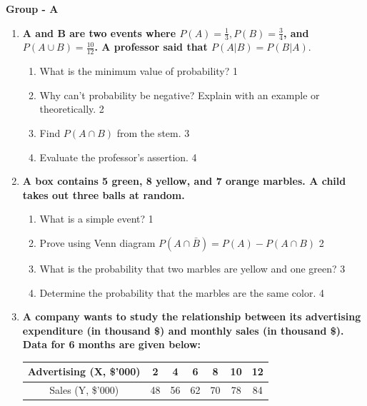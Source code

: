 \documentclass[12pt]{article}
\begin{document}
\begin{center}
\textbf{Group  - A}
\end{center}
\begin{enumerate}

  \item
	  \textbf{A and B are two events where $P(A) = \frac 13, P(B) = \frac 34$, and $P(A\cup B) = \frac{10}{12}$. A professor said that $P(A|B) = P(B|A)$}. 
  
  \begin{enumerate}
    \item
	What is the minimum value of probability? \hfill 1
    \item
	Why can't probability be negative? Explain with an example or theoretically. \hfill 2
    \item  
	Find $P(A \cap B)$ from the stem. \hfill 3
    \item
	Evaluate the professor's assertion. \hfill 4
  \end{enumerate}
  
     \item
	  \textbf{A box contains 5 green, 8 yellow, and 7 orange marbles. A child takes out three balls at random.} 
  
  \begin{enumerate}
  
    \item What is a simple event? \hfill 1
    \item Prove using Venn diagram $P(A\cap \bar B) = P(A) - P(A\cap B)$ \hfill 2
    \item  
	What is the probability that two marbles are yellow and one green? \hfill 3
    \item
	Determine the probability that the marbles are the same color. \hfill 4
  \end{enumerate}


  
\item
  \textbf{A company wants to study the relationship between its advertising expenditure (in thousand \$) and monthly sales (in thousand \$). Data for 6 months are given below:}

\begin{table}[h!]
\centering
\begin{tabular}{c|c|c|c|c|c|c}
Advertising (X, \$'000) & 2 & 4 & 6 & 8 & 10 & 12 \\ \hline
Sales (Y, \$'000) & 48 & 56 & 62 & 70 & 78 & 84 \\
\end{tabular}
\end{table}


\end{enumerate}
\end{document}
